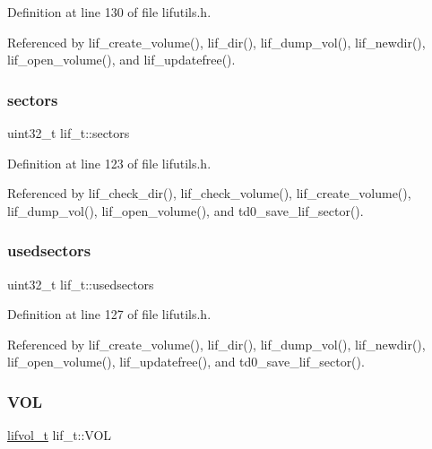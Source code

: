 Definition at line 130 of file lifutils.\+h.



Referenced by lif\+\_\+create\+\_\+volume(), lif\+\_\+dir(), lif\+\_\+dump\+\_\+vol(), lif\+\_\+newdir(), lif\+\_\+open\+\_\+volume(), and lif\+\_\+updatefree().

\mbox{\label{structlif__t_a262b14d8547abff49d9dd1b445faf6d5}} 
\subsubsection{\texorpdfstring{sectors}{sectors}}
{\footnotesize\ttfamily uint32\+\_\+t lif\+\_\+t\+::sectors}



Definition at line 123 of file lifutils.\+h.



Referenced by lif\+\_\+check\+\_\+dir(), lif\+\_\+check\+\_\+volume(), lif\+\_\+create\+\_\+volume(), lif\+\_\+dump\+\_\+vol(), lif\+\_\+open\+\_\+volume(), and td0\+\_\+save\+\_\+lif\+\_\+sector().

\mbox{\label{structlif__t_ad81767a2f65b997d5abecba130b89814}} 
\subsubsection{\texorpdfstring{usedsectors}{usedsectors}}
{\footnotesize\ttfamily uint32\+\_\+t lif\+\_\+t\+::usedsectors}



Definition at line 127 of file lifutils.\+h.



Referenced by lif\+\_\+create\+\_\+volume(), lif\+\_\+dir(), lif\+\_\+dump\+\_\+vol(), lif\+\_\+newdir(), lif\+\_\+open\+\_\+volume(), lif\+\_\+updatefree(), and td0\+\_\+save\+\_\+lif\+\_\+sector().

\mbox{\label{structlif__t_ae68126d2b9261ef9a6903a95d5c82cac}} 
\subsubsection{\texorpdfstring{V\+OL}{VOL}}
{\footnotesize\ttfamily \hyperlink{structlifvol__t}{lifvol\+\_\+t} lif\+\_\+t\+::\+V\+OL}



